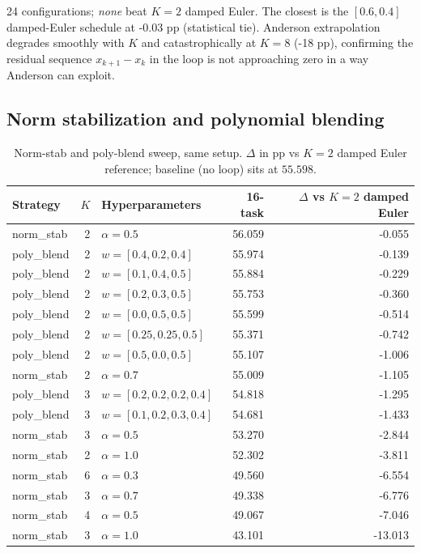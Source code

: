 24 configurations; \emph{none} beat $K{=}2$ damped Euler. The closest is the $[0.6,0.4]$ damped-Euler schedule at -0.03 pp (statistical tie). Anderson extrapolation degrades smoothly with $K$ and catastrophically at $K{=}8$ (-18 pp), confirming the residual sequence $x_{k+1} - x_k$ in the loop is not approaching zero in a way Anderson can exploit.

\subsection{Norm stabilization and polynomial blending}

\begin{table}[h]
\centering
\footnotesize
\caption{Norm-stab and poly-blend sweep, same setup. $\Delta$
in pp vs $K{=}2$ damped Euler reference; baseline (no loop) sits at $55.598$.}
\label{tab:phase7}
\begin{tabular}{lrlrr}
\toprule
Strategy & $K$ & Hyperparameters & 16-task & $\Delta$ vs $K{=}2$ damped Euler \\
\midrule
norm\_stab  & 2 & $\alpha{=}0.5$               & 56.059 & -0.055 \\
poly\_blend & 2 & $w{=}[0.4,0.2,0.4]$          & 55.974 & -0.139 \\
poly\_blend & 2 & $w{=}[0.1,0.4,0.5]$          & 55.884 & -0.229 \\
poly\_blend & 2 & $w{=}[0.2,0.3,0.5]$          & 55.753 & -0.360 \\
poly\_blend & 2 & $w{=}[0.0,0.5,0.5]$          & 55.599 & -0.514 \\
poly\_blend & 2 & $w{=}[0.25,0.25,0.5]$        & 55.371 & -0.742 \\
poly\_blend & 2 & $w{=}[0.5,0.0,0.5]$          & 55.107 & -1.006 \\
norm\_stab  & 2 & $\alpha{=}0.7$               & 55.009 & -1.105 \\
poly\_blend & 3 & $w{=}[0.2,0.2,0.2,0.4]$      & 54.818 & -1.295 \\
poly\_blend & 3 & $w{=}[0.1,0.2,0.3,0.4]$      & 54.681 & -1.433 \\
norm\_stab  & 3 & $\alpha{=}0.5$               & 53.270 & -2.844 \\
norm\_stab  & 2 & $\alpha{=}1.0$               & 52.302 & -3.811 \\
norm\_stab  & 6 & $\alpha{=}0.3$               & 49.560 & -6.554 \\
norm\_stab  & 3 & $\alpha{=}0.7$               & 49.338 & -6.776 \\
norm\_stab  & 4 & $\alpha{=}0.5$               & 49.067 & -7.046 \\
norm\_stab  & 3 & $\alpha{=}1.0$               & 43.101 & -13.013 \\
\bottomrule
\end{tabular}
\end{table}

